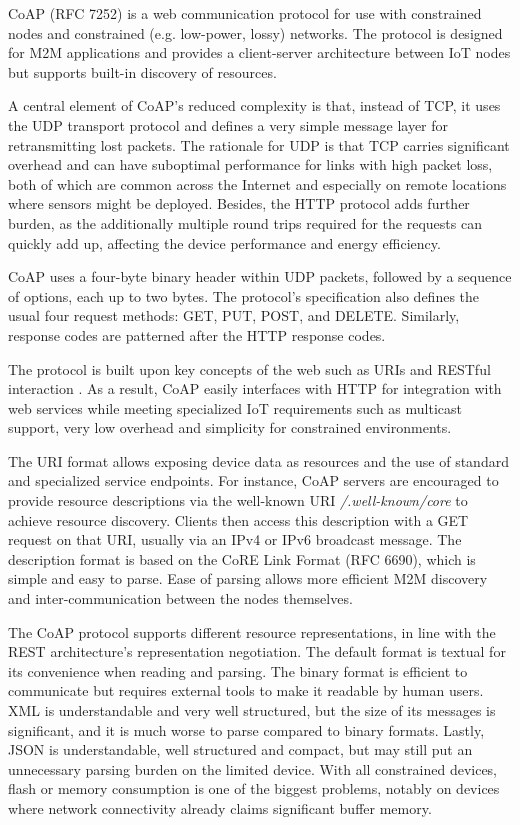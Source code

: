 CoAP \cite{coap} (RFC 7252) is a web communication protocol for use with constrained nodes and constrained (e.g. low-power, lossy) networks. The protocol is designed for M2M applications and provides a client-server architecture between IoT nodes but supports built-in discovery of resources.

A central element of CoAP's reduced complexity is that, instead of TCP, it uses the UDP transport protocol and defines a very simple message layer for retransmitting lost packets. The rationale for UDP is that TCP carries significant overhead and can have suboptimal performance for links with high packet loss, both of which are common across the Internet \cite{akamai} and especially on remote locations where sensors might be deployed. Besides, the HTTP protocol adds further burden, as the additionally multiple round trips required for the requests can quickly add up, affecting the device performance and energy efficiency.

CoAP uses a four-byte binary header within UDP packets, followed by a sequence of options, each up to two bytes. The protocol's specification also defines the usual four request methods: GET, PUT, POST, and DELETE. Similarly, response codes are patterned after the HTTP response codes.

The protocol is built upon key concepts of the web such as URIs and RESTful interaction \cite{coap-soa}. As a result, CoAP easily interfaces with HTTP for integration with web services while meeting specialized IoT requirements such as multicast support, very low overhead and simplicity for constrained environments. 

The URI format allows exposing device data as resources and the use of standard and specialized service endpoints. For instance, CoAP servers are encouraged to provide resource descriptions via the well-known URI \emph{/.well-known/core} to achieve resource discovery. Clients then access this description with a GET request on that URI, usually via an IPv4 or IPv6 broadcast message. The description format is based on the CoRE Link Format (RFC 6690), which is simple and easy to parse. Ease of parsing allows more efficient M2M discovery and inter-communication between the nodes themselves.

The CoAP protocol supports different resource representations, in line with the REST architecture's representation negotiation. The default format is textual for its convenience when reading and parsing. The binary format is efficient to communicate but requires external tools to make it readable by human users. XML is understandable and very well structured, but the size of its messages is significant, and it is much worse to parse compared to binary formats. Lastly, JSON is understandable, well structured and compact, but may still put an unnecessary parsing burden on the limited device. With all constrained devices, flash or memory consumption is one of the biggest problems, notably on devices where network connectivity already claims significant buffer memory.

